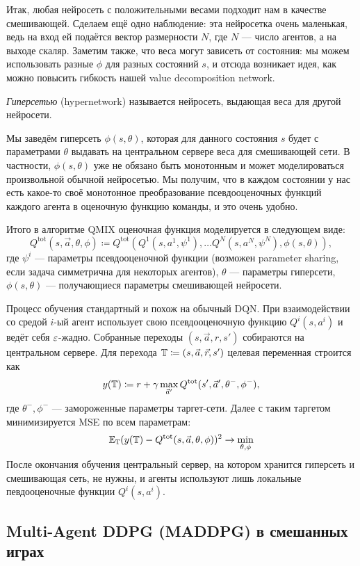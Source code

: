 Итак, любая нейросеть с положительными весами подходит нам в качестве смешивающей. Сделаем ещё одно наблюдение: эта нейросетка очень маленькая, ведь на вход ей подаётся вектор размерности $N$, где $N$ --- число агентов, а на выходе скаляр. Заметим также, что веса могут зависеть от состояния: мы можем использовать разные $\phi$ для разных состояний $s$, и отсюда возникает идея, как можно повысить гибкость нашей value decomposition network.

\begin{definition}
\emph{Гиперсетью} (hypernetwork) называется нейросеть, выдающая веса для другой нейросети.
\end{definition}

Мы заведём гиперсеть $\phi(s, \theta)$, которая для данного состояния $s$ будет с параметрами $\theta$ выдавать на центральном сервере веса для смешивающей сети. В частности, $\phi(s, \theta)$ уже не обязано быть монотонным и может моделироваться произвольной обычной нейросетью. Мы получим, что в каждом состоянии у нас есть какое-то своё монотонное преобразование псевдооценочных функций каждого агента в оценочную функцию команды, и это очень удобно.

Итого в алгоритме QMIX оценочная функция моделируется в следующем виде:
$$Q^{\mathrm{tot}}(s, \vec{a}, \theta, \phi) \coloneqq Q^{\mathrm{tot}}( Q^1(s, a^1, \psi^1), \dots Q^N(s, a^N, \psi^N), \phi(s, \theta)),$$
где $\psi^i$ --- параметры псевдооценочной функции (возможен parameter sharing, если задача симметрична для некоторых агентов), $\theta$ --- параметры гиперсети, $\phi(s, \theta)$ --- получающиеся параметры смешивающей нейросети.

Процесс обучения стандартный и похож на обычный DQN. При взаимодействии со средой $i$-ый агент использует свою псевдооценочную функцию $Q^i(s, a^i)$ и ведёт себя $\varepsilon$-жадно. Собранные переходы $(s, \vec{a}, r, s')$ собираются на центральном сервере. Для перехода $\mathbb{T} \coloneqq (s, \vec{a}, \vec{r}, s')$ целевая переменная строится как 
$$y(\mathbb{T}) \coloneqq r + \gamma \max_{\vec{a}'} Q^{\mathrm{tot}}(s', \vec{a}', \theta^-, \phi^-),$$
где $\theta^-, \phi^-$ --- замороженные параметры таргет-сети. Далее с таким таргетом минимизируется MSE по всем параметрам:
$$\mathbb{E}_{\mathbb{T}} (y(\mathbb{T}) - Q^{\mathrm{tot}}(s, \vec{a}, \theta, \phi))^2 \to \min_{\theta, \phi}$$
После окончания обучения центральный сервер, на котором хранится гиперсеть и смешивающая сеть, не нужны, и агенты используют лишь локальные певдооценочные функции $Q^i(s, a^i)$.

\subsection{Multi-Agent DDPG (MADDPG) в смешанных играх}

